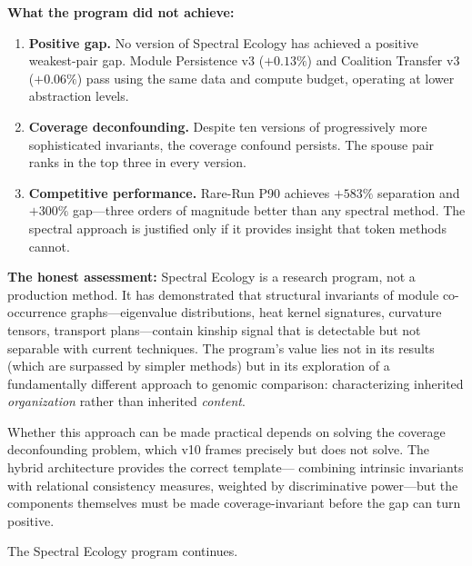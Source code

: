 \documentclass{../yalumba}
\begin{document}
\textbf{What the program did not achieve:}

\begin{enumerate}
\item \textbf{Positive gap.}  No version of Spectral Ecology has
  achieved a positive weakest-pair gap.  Module Persistence v3
  ($+0.13\%$) and Coalition Transfer v3 ($+0.06\%$) pass using
  the same data and compute budget, operating at lower abstraction
  levels.

\item \textbf{Coverage deconfounding.}  Despite ten versions of
  progressively more sophisticated invariants, the coverage confound
  persists.  The spouse pair ranks in the top three in every version.

\item \textbf{Competitive performance.}  Rare-Run P90 achieves
  $+583\%$ separation and $+300\%$ gap---three orders of magnitude
  better than any spectral method.  The spectral approach is justified
  only if it provides insight that token methods cannot.
\end{enumerate}

\textbf{The honest assessment:}  Spectral Ecology is a research
program, not a production method.  It has demonstrated that structural
invariants of module co-occurrence graphs---eigenvalue distributions,
heat kernel signatures, curvature tensors, transport plans---contain
kinship signal that is detectable but not separable with current
techniques.  The program's value lies not in its results (which are
surpassed by simpler methods) but in its exploration of a fundamentally
different approach to genomic comparison: characterizing inherited
\emph{organization} rather than inherited \emph{content}.

Whether this approach can be made practical depends on solving the
coverage deconfounding problem, which v10 frames precisely but does
not solve.  The hybrid architecture provides the correct template---
combining intrinsic invariants with relational consistency measures,
weighted by discriminative power---but the components themselves must
be made coverage-invariant before the gap can turn positive.

The Spectral Ecology program continues.



\end{document}

